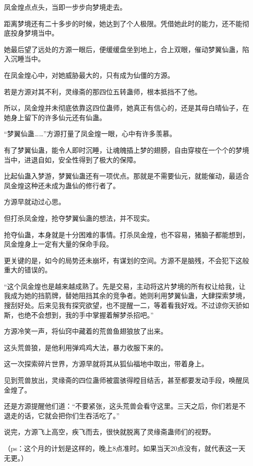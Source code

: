 \begin{this_body}
凤金煌点点头，当即一步步向梦境走去。

距离梦境还有二十多步的时候，她达到了个人极限。凭借她此时的能力，还不能彻底投身梦境当中。

她最后望了远处的方源一眼后，便缓缓盘坐到地上，合上双眼，催动梦翼仙蛊，陷入沉睡当中。

在凤金煌心中，对她威胁最大的，只有成为仙僵的方源。

若是方源对其不利，灵缘斋的那四位五转蛊师，根本抵挡不了他。

所以，凤金煌并未彻底依靠这四位蛊师，她真正有信心的，还是其母白晴仙子，在她身上留下的许多仙元还有仙蛊。

“梦翼仙蛊……”方源打量了凤金煌一眼，心中有许多羡慕。

有了梦翼仙蛊，能令人即时沉睡，让魂魄插上梦的翅膀，自由穿梭在一个个的梦境当中，进退自如，安全性得到了极大的保障。

比起仙蛊入梦游，梦翼仙蛊还有一项优点。那就是不需要仙元，就能催动，最适合凤金煌这种还未成为蛊仙的修行者了。

方源早就动过心思。

但打杀凤金煌，抢夺梦翼仙蛊的想法，并不现实。

抢夺仙蛊，本身就是十分困难的事情。打杀凤金煌，也不容易，猪脑子都能想到，凤金煌身上一定有大量的保命手段。

更关键的是，如今的局势还未崩坏，有谋划的空间。方源不是脑残，不会犯下这般重大的错误的。

“这个凤金煌也是越来越成熟了。先是交易，主动将这片梦境的所有权让给我，让我成为她的挡箭牌，替她阻挡其余的竞争者。她则利用梦翼仙蛊，大肆探索梦境，搜刮好处。后来见我有探究欲望，也不提醒一二，等着看我好戏。不过谅你天骄如斯，也绝不会想到，我的手中掌握着解梦杀招吧。”

方源冷笑一声，将仙窍中藏着的荒兽鱼翅狼放了出来。

这头荒兽狼，是他利用弹鸡鸡大法，暴力收服下来的。

这一次探索碎片世界，方源早就将其从狐仙福地中取出，带着身上。

见到荒兽放出，灵缘斋的四位蛊师被震骇得瞠目结舌，甚至都要发动手段，唤醒凤金煌了。

还是方源提醒他们道：“不要紧张，这头荒兽会看守这里。三天之后，你们若是不退走的话，它就会把你们生吞活吃了。”

说完，方源飞上高空，疾飞而去，很快就脱离了灵缘斋蛊师们的视野。

（ps：这个月的计划是这样的，晚上8点准时。如果当天20点没有，就代表这一天无更。）

\end{this_body}

